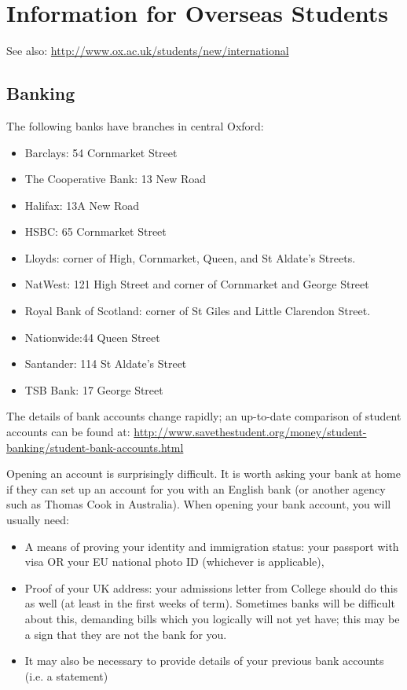 
\chapter{Information for Overseas Students}
\enlargethispage{\baselineskip}

See also: \url{http://www.ox.ac.uk/students/new/international}

\section{Banking} 

The following banks have branches in central Oxford:
\begin{itemize}
  \item Barclays: 54 Cornmarket Street
  \item The Cooperative Bank: 13 New Road
  \item Halifax: 13A New Road
  \item HSBC: 65 Cornmarket Street  
  \item Lloyds: corner of High, Cornmarket, Queen, and St Aldate's Streets. 
  \item NatWest: 121 High Street and corner of Cornmarket and George Street
  \item Royal Bank of Scotland: corner of St Giles and Little Clarendon Street.
  \item Nationwide:44 Queen Street
  \item Santander: 114 St Aldate's Street
  \item TSB Bank: 17 George Street
\end{itemize}

The details of bank accounts change rapidly; an up-to-date comparison of student accounts can be found at: 
\url{http://www.savethestudent.org/money/student-banking/student-bank-accounts.html} 

Opening an account is surprisingly difficult. It is worth asking your bank at home if they can set up an account for you with an English bank (or another agency such as Thomas Cook in Australia). When opening your bank account, you will usually need:
\begin{itemize}
  \item A means of proving your identity and immigration status: your
passport with visa OR your EU national photo ID (whichever is applicable),
 \item Proof of your UK address: your admissions letter from College should do
 this as well (at least in the first weeks of term). Sometimes banks will be difficult about this, demanding bills which you logically will not yet have; this may be a sign that they are not the bank for you. 
 \item It may also be necessary to provide details of your previous bank
 accounts (i.e. a statement) 
\end{itemize}

